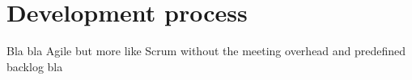 \section{Development process}

Bla bla Agile but more like Scrum without the meeting overhead and predefined backlog bla

